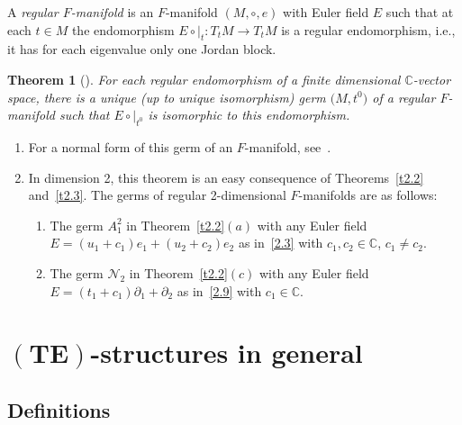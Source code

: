 \documentclass[pdftex]{sigma}%
\numberwithin{equation}{section}
\numberwithin{figure}{section}
\newcommand{\C}{{\mathbb C}}
\newcommand{\NN}{{\mathcal N}}
\newcommand{\paa}{\partial}
\newtheorem{Theorem}{Theorem}[section]
\begin{document}
\begin{Definition}[{\cite[Definition 1.2]{DH17}}]\label{t2.4}
A {\it regular $F$-manifold} is an $F$-manifold
$(M,\circ,e)$ with Euler field $E$ such that at each
$t\in M$ the endomorphism $E\circ|_t\colon T_tM\to T_tM$
is a regular endomorphism, i.e., it has for each eigenvalue
only one Jordan block.
\end{Definition}

\begin{Theorem}[{\cite[Theorem~1.3(ii)]{DH17}}]\label{t2.5}
For each regular endomorphism of a finite dimensional
$\C$-vector space, there is a unique (up to unique
isomorphism) germ $\big(M,t^0\big)$ of a regular $F$-manifold
such that $E\circ|_{t^0}$ is isomorphic to this endomorphism.
\end{Theorem}

\begin{Remarks}\label{t2.6}\qquad
\begin{enumerate}\itemsep=0pt
\item[$(i)$] For a normal form of this germ of an $F$-manifold,
see~\cite[Theorem~1.3(i)]{DH17}.

\item[$(ii)$]
In dimension 2, this theorem is an easy consequence
of Theorems~\ref{t2.2} and~\ref{t2.3}. The germs of
regular 2-dimensional $F$-manifolds are as follows:
\begin{enumerate}\itemsep=0pt%
\item[$(a)$]
The germ $A_1^2$ in Theorem~\ref{t2.2}$(a)$ with any Euler field
$E=(u_1+c_1)e_1+(u_2+c_2)e_2$
as in~\eqref{2.3} with $c_1,c_2\in\C$, $c_1\neq c_2$.
\item[$(b)$]
The germ $\NN_2$ in Theorem~\ref{t2.2}$(c)$ with any Euler field
$E=(t_1+c_1)\paa_1+\paa_2$ as in~\eqref{2.9}
with $c_1\in\C$.
\end{enumerate}
\end{enumerate}
\end{Remarks}

\section[$(TE)$-structures in general]{$\boldsymbol{(TE)}$-structures in general}\label{c3}

\subsection{Definitions}%
\end{document}
